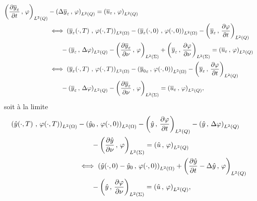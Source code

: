 \begin{equation*}
    \begin{split}
        \scalaireq{\primetemps{\bareps{y}}}{\vphi} &- \scalaireq{%
            \Delta\bareps{y}
        }{%
            \vphi%
        } = \scalaireq{\bareps{u}}{\vphi}\\
        &\iff \scalaireohm{%
            \condfinale{\bareps{y}}
        }{%
            \condfinale{\vphi}
        } - \scalaireohm{%
            \condinitiale{\bareps{y}}
        }{%
            \condinitiale{\vphi}
        } - \scalaireq{%
            \bareps{y}
        }{%
            \primetemps{\vphi}
        }\\
        &\qquad - \scalaireq{%
            \bareps{y}
        }{%
            \Delta\vphi%
        } - \scalaires{%
            \deriveenormale{\bareps{y}}
        }{%
            \vphi%
        } + \scalaires{%
            \bareps{y}
        }{%
            \deriveenormale{\vphi}
        } = \scalaireq{\bareps{u}}{\vphi}\\
        &\iff \scalaireohm{%
            \condfinale{\bareps{y}}
        }{%
            \condfinale{\vphi}
        } - \scalaireohm{%
            {\bar{y}_{0}}_{\veps}
        }{%
            \condinitiale{\vphi}
        } - \scalaireq{%
            \bareps{y}
        }{%
            \primetemps{\vphi}
        }\\
        &\qquad - \scalaireq{%
            \bareps{y}
        }{%
            \Delta\vphi%
        } - \scalaires{%
            \deriveenormale{\bareps{y}}
        }{%
            \vphi%
        } = \scalaireq{\bareps{u}}{\vphi},
    \end{split}
\end{equation*}
soit à la limite
\begin{equation*}
    \begin{split}
        \scalaireohm{%
            \condfinale{\hat{y}}
        }{%
            \condfinale{\vphi}
        } & - \scalaireohm{%
            {\hat{y}}_{0}
        }{%
            \condinitiale{\vphi}
        } - \scalaireq{%
            \hat{y}
        }{%
            \primetemps{\vphi}
        } - \scalaireq{%
            \hat{y}
        }{%
            \Delta\vphi%
        }\\
        &\qquad - \scalaires{%
            \deriveenormale{\hat{y}}
        }{%
            \vphi%
        } = \scalaireq{\hat{u}}{\vphi}\\
        &\iff \scalaireohm{%
            \condinitiale{\hat{y}} - {\hat{y}}_{0}
        }{%
            \condinitiale{\vphi}
        } + \scalaireq{%
            \primetemps{\hat{y}} - \Delta\hat{y}
        }{%
            \vphi%
        }\\
        &\qquad - \scalaires{%
            \hat{y}
        }{%
            \deriveenormale{\vphi}
        } = \scalaireq{\hat{u}}{\vphi},
    \end{split}
\end{equation*}
